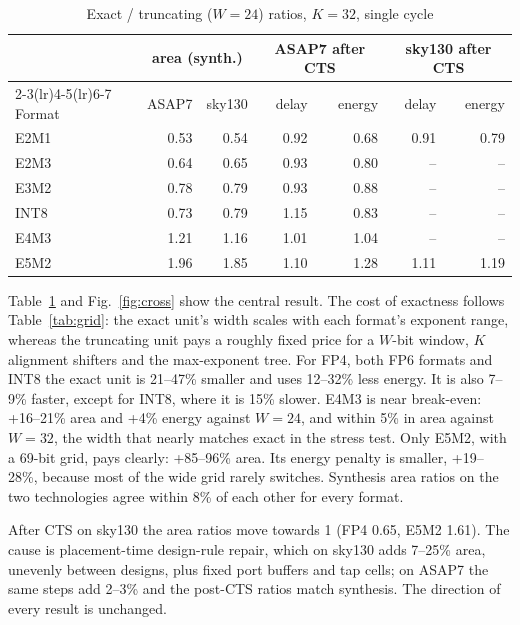 \documentclass[conference,compsoc]{IEEEtran}
\begin{document}
\begin{table}[t]
\centering
\caption{Exact / truncating ($W{=}24$) ratios, $K{=}32$, single cycle}
\label{tab:cost}
\setlength{\tabcolsep}{3.5pt}
\begin{tabular}{lrrrrrr}
\toprule
& \multicolumn{2}{c}{area (synth.)} & \multicolumn{2}{c}{ASAP7 after CTS} & \multicolumn{2}{c}{sky130 after CTS} \\
\cmidrule(lr){2-3}\cmidrule(lr){4-5}\cmidrule(lr){6-7}
Format & ASAP7 & sky130 & delay & energy & delay & energy \\
\midrule
E2M1 & 0.53 & 0.54 & 0.92 & 0.68 & 0.91 & 0.79 \\
E2M3 & 0.64 & 0.65 & 0.93 & 0.80 & --   & --   \\
E3M2 & 0.78 & 0.79 & 0.93 & 0.88 & --   & --   \\
INT8 & 0.73 & 0.79 & 1.15 & 0.83 & --   & --   \\
E4M3 & 1.21 & 1.16 & 1.01 & 1.04 & --   & --   \\
E5M2 & 1.96 & 1.85 & 1.10 & 1.28 & 1.11 & 1.19 \\
\bottomrule
\end{tabular}
\end{table}

Table~\ref{tab:cost} and Fig.~\ref{fig:cross} show the central result.  The
cost of exactness follows Table~\ref{tab:grid}: the exact unit's width
scales with each format's exponent range, whereas the truncating unit pays a
roughly fixed price for a $W$-bit window, $K$ alignment shifters and the
max-exponent tree.  For FP4, both FP6 formats and INT8 the exact unit is
21--47\% smaller and uses 12--32\% less energy.  It is also 7--9\% faster,
except for INT8, where it is 15\% slower.  E4M3 is near break-even:
+16--21\% area and +4\% energy against $W=24$, and within 5\% in area
against $W=32$, the width that nearly matches exact in the stress test.
Only E5M2, with a 69-bit grid, pays clearly: +85--96\% area.  Its energy
penalty is smaller, +19--28\%, because most of the wide grid rarely
switches.  Synthesis area ratios on the two technologies agree within 8\%
of each other for every format.

After CTS on sky130 the area ratios move towards 1 (FP4 0.65, E5M2 1.61).
The cause is placement-time design-rule repair, which on sky130 adds 7--25\%
area, unevenly between designs, plus fixed port buffers and tap cells; on
ASAP7 the same steps add 2--3\% and the post-CTS ratios match synthesis.
The direction of every result is unchanged.
\end{document}
